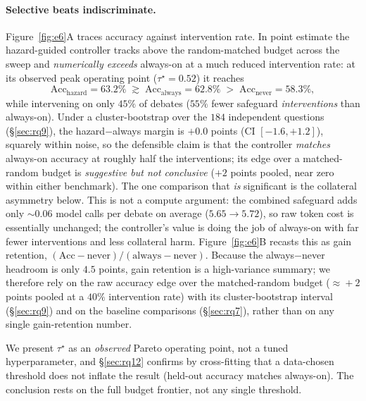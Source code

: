 \paragraph{Selective beats indiscriminate.}
Figure~\ref{fig:e6}A traces accuracy against intervention rate. In point estimate the
hazard-guided controller tracks above the random-matched budget across the sweep and
\emph{numerically exceeds} always-on at a much reduced intervention rate: at its
observed peak operating point ($\tau^\star=0.52$) it reaches
\[
  \mathrm{Acc}_{\text{hazard}} = 63.2\%
  \;\gtrsim\;
  \mathrm{Acc}_{\text{always}} = 62.8\%
  \;>\;
  \mathrm{Acc}_{\text{never}} = 58.3\%,
\]
while intervening on only $45\%$ of debates ($55\%$ fewer safeguard
\emph{interventions} than always-on). Under a cluster-bootstrap over the $184$
independent questions (\S\ref{sec:rq9}), the hazard$-$always margin is $+0.0$ points
(CI $[-1.6,+1.2]$), squarely within noise, so the defensible claim is that the
controller \emph{matches} always-on accuracy at roughly half the interventions; its
edge over a matched-random budget is \emph{suggestive but not conclusive} ($+2$ points
pooled, near zero within either benchmark). The one comparison that \emph{is}
significant is the collateral asymmetry below. This is not a compute
argument: the combined safeguard adds only $\sim\!0.06$ model calls per debate on
average ($5.65\!\to\!5.72$), so raw token cost is essentially unchanged; the
controller's value is doing the job of always-on with far fewer interventions and less
collateral harm. Figure~\ref{fig:e6}B recasts this as
gain retention, $(\mathrm{Acc}-\mathrm{never})/(\mathrm{always}-\mathrm{never})$.
Because the always$-$never headroom is only $4.5$ points, gain retention is a
high-variance summary; we therefore rely on the raw accuracy edge over the
matched-random budget ($\approx\!+2$ points pooled at a $40\%$ intervention rate) with
its cluster-bootstrap interval (\S\ref{sec:rq9}) and on the baseline comparisons
(\S\ref{sec:rq7}), rather than on any single gain-retention number.

We present $\tau^\star$ as an \emph{observed} Pareto operating point, not a tuned
hyperparameter, and \S\ref{sec:rq12} confirms by cross-fitting that a data-chosen
threshold does not inflate the result (held-out accuracy matches always-on). The
conclusion rests on the full budget frontier, not any single threshold.

